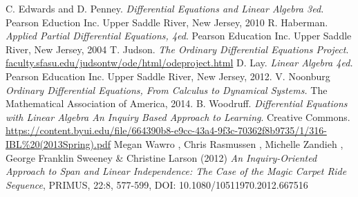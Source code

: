 \documentclass[12pt,oneside]{book}
\theoremstyle{definition}
\begin{document}
\begin{thebibliography}{99}
         C. Edwards and D. Penney. {\it Differential Equations and Linear Algebra
        3ed.} Pearson Eduction Inc.  Upper Saddle River, New Jersey, 2010
         R. Haberman. {\it Applied Partial Differential Equations,
        4ed}.  Pearson Education Inc. Upper Saddle River, New Jersey, 2004
         T. Judson. {\it The Ordinary Differential Equations Project}.
        \href{http://faculty.sfasu.edu/judsontw/ode/html/odeproject.html}{faculty.sfasu.edu/judsontw/ode/html/odeproject.html}
         D. Lay. {\it Linear Algebra 4ed.} Pearson Education Inc. Upper
        Saddle River, New Jersey, 2012.
         V. Noonburg {\it Ordinary Differential Equations, From Calculus
        to Dynamical Systems.} The Mathematical Association of America, 2014.
         B. Woodruff. {\it Differential Equations with Linear Algebra An
        Inquiry Based Approach to Learning}. Creative Commons.
        \\\href{https://content.byui.edu/file/664390b8-e9cc-43a4-9f3c-70362f8b9735/1/316-IBL\%20(2013Spring).pdf}{https://content.byui.edu/file/664390b8-e9cc-43a4-9f3c-70362f8b9735/1/316-IBL\%20(2013Spring).pdf}
         Megan Wawro , Chris Rasmussen , Michelle Zandieh , George
        Franklin Sweeney \& Christine Larson (2012) {\it An Inquiry-Oriented Approach to Span
        and Linear Independence: The Case of the Magic Carpet Ride Sequence}, PRIMUS, 22:8,
        577-599, DOI: 10.1080/10511970.2012.667516
\end{thebibliography}
\end{document}
